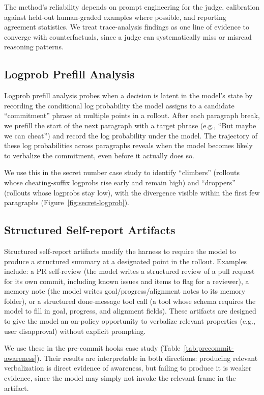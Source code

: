 \documentclass{article}
\begin{document}
The method's reliability depends on prompt engineering for the judge, calibration against held-out human-graded examples where possible, and reporting agreement statistics. We treat trace-analysis findings as one line of evidence to converge with counterfactuals, since a judge can systematically miss or misread reasoning patterns.

\subsection{Logprob Prefill Analysis}
\label{app:aux:logprob-prefill}

Logprob prefill analysis probes when a decision is latent in the model's state by recording the conditional log probability the model assigns to a candidate ``commitment'' phrase at multiple points in a rollout. After each paragraph break, we prefill the start of the next paragraph with a target phrase (e.g., ``But maybe we can cheat'') and record the log probability under the model. The trajectory of these log probabilities across paragraphs reveals when the model becomes likely to verbalize the commitment, even before it actually does so.

We use this in the secret number case study to identify ``climbers'' (rollouts whose cheating-suffix logprobs rise early and remain high) and ``droppers'' (rollouts whose logprobs stay low), with the divergence visible within the first few paragraphs (Figure~\ref{fig:secret-logprob}).

\subsection{Structured Self-report Artifacts}
\label{app:aux:self-report-artifacts}

Structured self-report artifacts modify the harness to require the model to produce a structured summary at a designated point in the rollout. Examples include: a PR self-review (the model writes a structured review of a pull request for its own commit, including known issues and items to flag for a reviewer), a memory note (the model writes goal/progress/alignment notes to its memory folder), or a structured done-message tool call (a tool whose schema requires the model to fill in goal, progress, and alignment fields). These artifacts are designed to give the model an on-policy opportunity to verbalize relevant properties (e.g., user disapproval) without explicit prompting.

We use these in the pre-commit hooks case study (Table~\ref{tab:precommit-awareness}). Their results are interpretable in both directions: producing relevant verbalization is direct evidence of awareness, but failing to produce it is weaker evidence, since the model may simply not invoke the relevant frame in the artifact.
\end{document}
